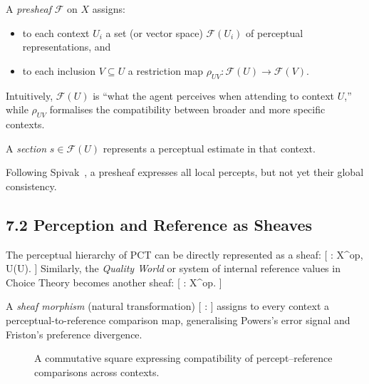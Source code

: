 \documentclass[11pt,a4paper,twoside]{article}
\begin{document}
A \emph{presheaf} $\mathcal{F}$ on $X$ assigns:
\begin{itemize}
\item to each context $U_i$ a set (or vector space) $\mathcal{F}(U_i)$ of perceptual representations, and
\item to each inclusion $V\subseteq U$ a restriction map $\rho_{U V}:\mathcal{F}(U)\to\mathcal{F}(V)$.
\end{itemize}

Intuitively, $\mathcal{F}(U)$ is ``what the agent perceives when attending to context $U$,'' while $\rho_{UV}$ formalises the compatibility between broader and more specific contexts.

A \emph{section} $s\in\mathcal{F}(U)$ represents a perceptual estimate in that context.

Following Spivak~\cite{spivak2013ologs}, a presheaf expresses all local percepts, but not yet their global consistency.

\subsection{7.2 Perception and Reference as Sheaves}

The perceptual hierarchy of PCT can be directly represented as a sheaf:
[
: X^{op}\to{}, \qquad U\mapsto {}(U).
]
Similarly, the \emph{Quality World} or system of internal reference values in Choice Theory becomes another sheaf:
[
: X^{op}\to{}.
]

A \emph{sheaf morphism} (natural transformation)
[
\Phi:  \Rightarrow {}
]
assigns to every context a perceptual-to-reference comparison map, generalising Powers's error signal and Friston's preference divergence.

\begin{figure}[h]
\centering
{}
\caption{A commutative square expressing compatibility of percept--reference comparisons across contexts.}
\end{figure}
\end{document}
